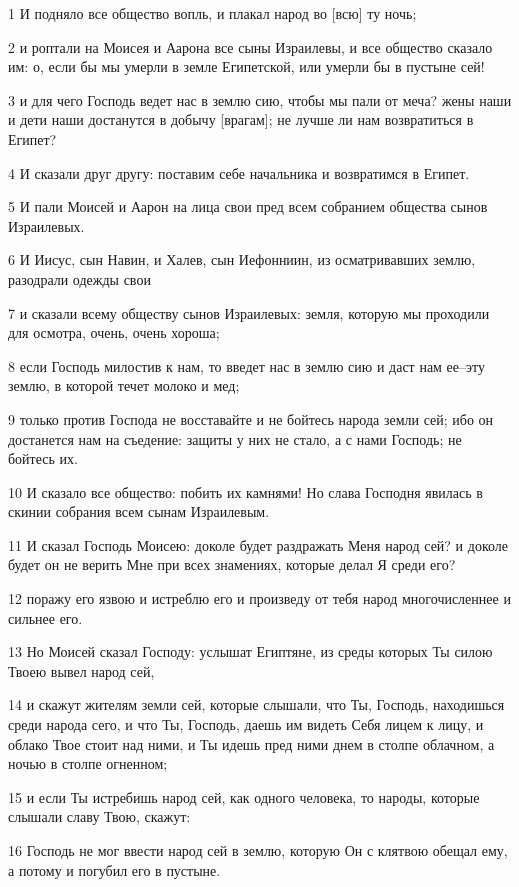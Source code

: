 \par 1 И подняло все общество вопль, и плакал народ во [всю] ту ночь;
\par 2 и роптали на Моисея и Аарона все сыны Израилевы, и все общество сказало им: о, если бы мы умерли в земле Египетской, или умерли бы в пустыне сей!
\par 3 и для чего Господь ведет нас в землю сию, чтобы мы пали от меча? жены наши и дети наши достанутся в добычу [врагам]; не лучше ли нам возвратиться в Египет?
\par 4 И сказали друг другу: поставим себе начальника и возвратимся в Египет.
\par 5 И пали Моисей и Аарон на лица свои пред всем собранием общества сынов Израилевых.
\par 6 И Иисус, сын Навин, и Халев, сын Иефонниин, из осматривавших землю, разодрали одежды свои
\par 7 и сказали всему обществу сынов Израилевых: земля, которую мы проходили для осмотра, очень, очень хороша;
\par 8 если Господь милостив к нам, то введет нас в землю сию и даст нам ее--эту землю, в которой течет молоко и мед;
\par 9 только против Господа не восставайте и не бойтесь народа земли сей; ибо он достанется нам на съедение: защиты у них не стало, а с нами Господь; не бойтесь их.
\par 10 И сказало все общество: побить их камнями! Но слава Господня явилась в скинии собрания всем сынам Израилевым.
\par 11 И сказал Господь Моисею: доколе будет раздражать Меня народ сей? и доколе будет он не верить Мне при всех знамениях, которые делал Я среди его?
\par 12 поражу его язвою и истреблю его и произведу от тебя народ многочисленнее и сильнее его.
\par 13 Но Моисей сказал Господу: услышат Египтяне, из среды которых Ты силою Твоею вывел народ сей,
\par 14 и скажут жителям земли сей, которые слышали, что Ты, Господь, находишься среди народа сего, и что Ты, Господь, даешь им видеть Себя лицем к лицу, и облако Твое стоит над ними, и Ты идешь пред ними днем в столпе облачном, а ночью в столпе огненном;
\par 15 и если Ты истребишь народ сей, как одного человека, то народы, которые слышали славу Твою, скажут:
\par 16 Господь не мог ввести народ сей в землю, которую Он с клятвою обещал ему, а потому и погубил его в пустыне.

